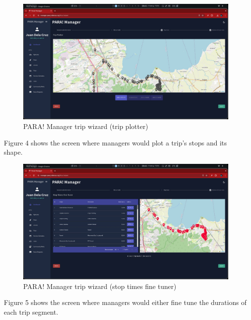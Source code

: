 \documentclass{icsthesis}
\begin{document}
\begin{mainmatter}
\begin{description}
		\begin{figure}[!h]
			\centering
				\includegraphics[scale=0.18]{./figures/manager/trip wizard 2.jpeg}
			\caption{PARA! Manager trip wizard (trip plotter)}
		\end{figure}
		
		Figure 4 shows the screen where managers would plot a trip's stops and its shape.
		
		\begin{figure}[!h]
			\centering
				\includegraphics[scale=0.18]{./figures/manager/trip wizard 3.jpeg}
			\caption{PARA! Manager trip wizard (stop times fine tuner)}
		\end{figure}
		
		Figure 5 shows the screen where managers would either fine tune the durations of each trip segment. 
		

\end{description}
\end{mainmatter}
\end{document}
